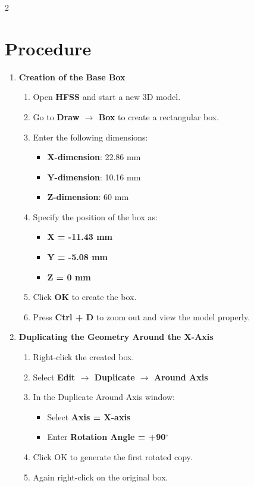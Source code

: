 \documentclass[11pt, a4paper]{article}
\begin{document}
\begin{multicols}{2}
\section*{Procedure}
\renewcommand{\labelenumii}{\alph{enumii}.}
\begin{enumerate}[leftmargin=*, itemsep=15pt]
	\item \textbf{Creation of the Base Box}
	\begin{enumerate}
		\item Open \textbf{HFSS} and start a new 3D model.
		\item Go to \textbf{Draw $\rightarrow$ Box} to create a rectangular box.
		\item Enter the following dimensions:
		\begin{itemize}
			\item \textbf{X-dimension}: 22.86 mm
			\item \textbf{Y-dimension}: 10.16 mm
			\item \textbf{Z-dimension}: 60 mm
		\end{itemize}
		\item Specify the position of the box as:
		\begin{itemize}
			\item \textbf{X = -11.43 mm}
			\item \textbf{Y = -5.08 mm}
			\item \textbf{Z = 0 mm}
		\end{itemize}
		\item Click \textbf{OK} to create the box.
		\item Press \textbf{Ctrl + D} to zoom out and view the model properly.
	\end{enumerate}
	\item \textbf{Duplicating the Geometry Around the X-Axis}
	\begin{enumerate}
		\item Right-click the created box.
		\item Select \textbf{Edit $\rightarrow$ Duplicate $\rightarrow$ Around Axis}
		\item In the Duplicate Around Axis window:
		\begin{itemize}
			\item Select \textbf{Axis = X-axis}
			\item Enter \textbf{Rotation Angle = +90$^\circ$}
		\end{itemize}
		\item Click OK to generate the first rotated copy.
		\item Again right-click on the original box.

\end{enumerate}
\end{enumerate}
\end{multicols}
\end{document}
